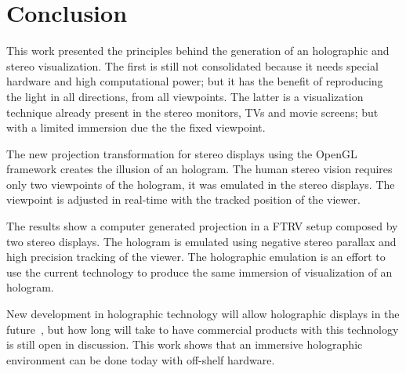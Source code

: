 \section{Conclusion}
\label{sec.conclusion}

This work presented the principles behind the generation of an holographic and stereo visualization. The first is still not consolidated because it needs special hardware and high computational power; but it has the benefit of reproducing the light in all directions, from all viewpoints. The latter is a visualization technique already present in the stereo monitors, TVs and movie screens; but with a limited immersion due the the fixed viewpoint.

The new projection transformation for stereo displays using the OpenGL framework creates the illusion of an hologram. The human stereo vision requires only two viewpoints of the hologram, it was emulated in the stereo displays. The viewpoint is adjusted in real-time with the tracked position of the viewer.

The results show a computer generated projection in a FTRV setup composed by two stereo displays. The hologram is emulated using negative stereo parallax and high precision tracking of the viewer. The holographic emulation is an effort to use the current technology to produce the same immersion of visualization of an hologram. 

New development in holographic technology will allow holographic displays in the future~\cite{Lucente2012}, but how long will take to have commercial products with this technology is still open in discussion. This work shows that an immersive holographic environment can be done today with off-shelf hardware. 

